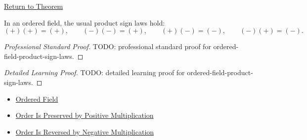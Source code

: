 \newpage
{}
\label{prf:ordered-field-product-sign-laws}

\begin{remark*}[Return]
\hyperref[lem:ordered-field-product-sign-laws]{Return to Theorem}
\end{remark*}

\begin{lemma*}
In an ordered field, the usual product sign laws hold:
\[
(+)(+)=(+),\qquad (-)(-)=(+),\qquad (+)(-)=(-),\qquad (-)(+) = (-).
\]
\end{lemma*}

\begin{proof}[Professional Standard Proof]
\LRAProofBodyStart
TODO: professional standard proof for ordered-field-product-sign-laws.
\end{proof}

\begin{proof}[Detailed Learning Proof]
\LRAProofBodyStart
TODO: detailed learning proof for ordered-field-product-sign-laws.
\end{proof}

\begin{remark*}
\end{remark*}

\begin{dependencies}
\begin{itemize}
  \item \hyperref[def:ordered-field]{Ordered Field}
  \item \hyperref[thm:ordered-field-positive-multiplication-preserves-order]{Order Is Preserved by Positive Multiplication}
  \item \hyperref[thm:ordered-field-negative-multiplication-reverses-order]{Order Is Reversed by Negative Multiplication}
\end{itemize}
\end{dependencies}

\clearpage
